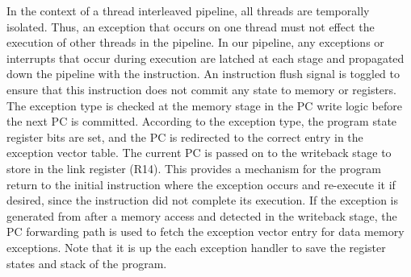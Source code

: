 In the context of a thread interleaved pipeline, all threads are temporally isolated. 
Thus, an exception that occurs on one thread must not effect the execution of other threads in the pipeline.
In our pipeline, any exceptions or interrupts that occur during execution are latched at each stage and propagated down the pipeline with the instruction. 
An instruction flush signal is toggled to ensure that this instruction does not commit any state to memory or registers. 
The exception type is checked at the memory stage in the PC write logic before the next PC is committed.  
According to the exception type, the program state register bits are set, and the PC is redirected to the correct entry in the exception vector table. 
The current PC is passed on to the writeback stage to store in the link register (R14).
This provides a mechanism for the program return to the initial instruction where the exception occurs and re-execute it if desired, since the instruction did not complete its execution.
If the exception is generated from after a memory access and detected in the writeback stage, the PC forwarding path is used to fetch the exception vector entry for data memory exceptions. 
Note that it is up the each exception handler to save the register states and stack of the program.  

